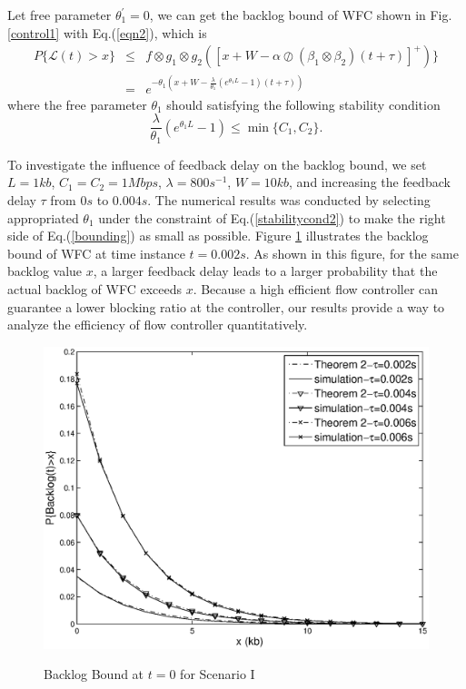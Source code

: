 \documentclass[12pt]{article}
\begin{document}
Let free parameter $\theta_1^\prime=0$, we can get the backlog bound of WFC shown in Fig. \ref{control1} with Eq.(\ref{eqn2}), which is
\begin{eqnarray}\label{bounding}
P\{\mathcal{L}(t)>x\}&\leq& f\otimes g_1\otimes g_2([x+W-\alpha\oslash(\beta_1\otimes\beta_2)(t+\tau)]^+)\}\nonumber\\
&=& e^{-\theta_1(x+W-\frac{\lambda}{\theta_1}(e^{\theta_1 L}-1)(t+\tau))}
\end{eqnarray}
where the free parameter $\theta_1$ should satisfying the following stability condition
\begin{equation}\label{stabilitycond2}
\frac{\lambda}{\theta_1}(e^{\theta_1 L}-1)\leq \min\{C_1,C_2\}.
\end{equation}

To investigate the influence of feedback delay on the backlog bound, we set $L=1kb$, $C_1=C_2=1Mbps$, $\lambda=800s^{-1}$, $W=10kb$, and increasing the feedback delay $\tau$ from $0s$ to $0.004s$. The numerical results was conducted by selecting appropriated $\theta_1$ under the constraint of Eq.(\ref{stabilitycond2}) to make the right side of Eq.(\ref{bounding}) as small as possible. Figure \ref{backlogtau} illustrates the backlog bound of WFC at time instance $t=0.002s$. As shown in this figure, for the same backlog value $x$, a larger feedback delay leads to a larger probability that the actual backlog of WFC exceeds $x$. Because a high efficient flow controller can guarantee a lower blocking ratio at the controller, our results  provide a way to analyze the efficiency of flow controller quantitatively.
\begin{figure}[bpt]
  \centering
  \includegraphics[scale=0.45]{figures/backlogtau.eps}\\
  \caption{Backlog Bound at $t=0$ for Scenario I}\label{backlogtau}
\end{figure}
\end{document}
